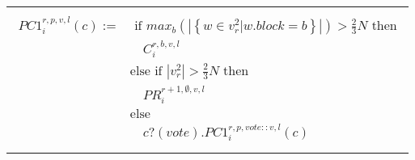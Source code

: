 \documentclass[12pt]{report}
\renewcommand{\|}{\;|\;}
\begin{document}
\begin{center}
\begin{tabular}{l }
		\hline \\
		{$\!\begin{aligned}
		PC1_i^{r,p,v,l}(c) := 
			& \text{ if } max_{b}(|\left\{ w \in v_r^2 | w.block = b\right\}|) > \frac{2}{3} N \text{ then} \\
				& \quad C_i^{r,b,v,l} \\
			& \text{else if }  | v_r^2 | > \frac{2}{3} N \text{ then} \\ 
				& \quad PR_i^{r+1,\emptyset,v,l} \\ 
			& \text{else} \\
				& \quad c?(vote) . PC1_i^{r,p,vote::v,l}(c) \\
		\end{aligned}$}


	\end{tabular}
\end{center}
\end{document}
